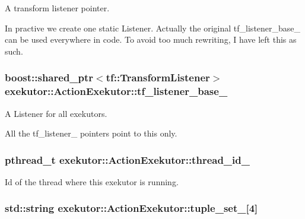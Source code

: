 \-A transform listener pointer. 

\-In practive we create one static \-Listener. \-Actually the original tf\-\_\-listener\-\_\-base\-\_\- can be used everywhere in code. \-To avoid too much rewriting, \-I have left this as such. \hypertarget{classexekutor_1_1ActionExekutor_aae544e9d0fdc59eb5c85b05d4af8afb8}{
\subsubsection[{tf\-\_\-listener\-\_\-base\-\_\-}]{\setlength{\rightskip}{0pt plus 5cm}boost\-::shared\-\_\-ptr$<$tf\-::\-Transform\-Listener$>$ {\bf exekutor\-::\-Action\-Exekutor\-::tf\-\_\-listener\-\_\-base\-\_\-}}}\label{classexekutor_1_1ActionExekutor_aae544e9d0fdc59eb5c85b05d4af8afb8}


\-A \-Listener for all exekutors. 

\-All the tf\-\_\-listener\-\_\- pointers point to this only. \hypertarget{classexekutor_1_1ActionExekutor_a8d7e748c6d705da31eea62af6723ebca}{
\subsubsection[{thread\-\_\-id\-\_\-}]{\setlength{\rightskip}{0pt plus 5cm}pthread\-\_\-t {\bf exekutor\-::\-Action\-Exekutor\-::thread\-\_\-id\-\_\-}}}\label{classexekutor_1_1ActionExekutor_a8d7e748c6d705da31eea62af6723ebca}


\-Id of the thread where this exekutor is running. 

\hypertarget{classexekutor_1_1ActionExekutor_a22f5cde3fe83eb147ec50c2d760b2d1f}{
\subsubsection[{tuple\-\_\-set\-\_\-}]{\setlength{\rightskip}{0pt plus 5cm}std\-::string {\bf exekutor\-::\-Action\-Exekutor\-::tuple\-\_\-set\-\_\-}\mbox{[}4\mbox{]}}}\label{classexekutor_1_1ActionExekutor_a22f5cde3fe83eb147ec50c2d760b2d1f}


